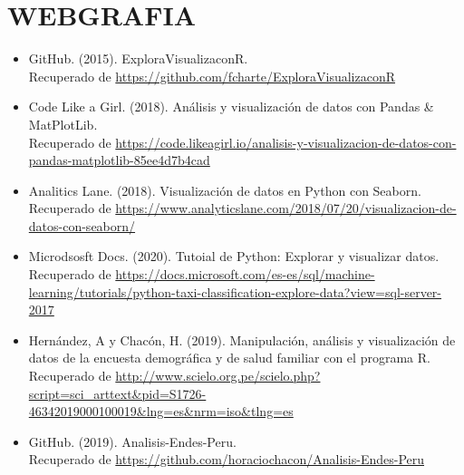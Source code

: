 \documentclass[12pt,letterpaper]{article}
\begin{document}
    \newpage
    \section{WEBGRAFIA}
    \begin{itemize}
        \item GitHub. (2015). ExploraVisualizaconR.\\
        Recuperado de \textcolor{azul}{\url{https://github.com/fcharte/ExploraVisualizaconR}}
        \item Code Like a Girl. (2018). Análisis y visualización de datos con Pandas \& MatPlotLib.\\
        Recuperado de \textcolor{azul}{\url{https://code.likeagirl.io/analisis-y-visualizacion-de-datos-con-pandas-matplotlib-85ee4d7b4cad}}
        \item Analitics Lane. (2018). Visualización de datos en Python con Seaborn.\\
        Recuperado de \textcolor{azul}{\url{https://www.analyticslane.com/2018/07/20/visualizacion-de-datos-con-seaborn/}}
        \item Microdsosft Docs. (2020). Tutoial de Python: Explorar y visualizar datos.\\
        Recuperado de \textcolor{azul}{\url{https://docs.microsoft.com/es-es/sql/machine-learning/tutorials/python-taxi-classification-explore-data?view=sql-server-2017}}
        \item Hernández, A y Chacón, H. (2019). Manipulación, análisis y visualización de datos de la encuesta demográfica y de salud familiar con el programa R.\\
        Recuperado de \textcolor{azul}{\url{http://www.scielo.org.pe/scielo.php?script=sci_arttext&pid=S1726-46342019000100019&lng=es&nrm=iso&tlng=es}}
        \item GitHub. (2019). Analisis-Endes-Peru.\\
        Recuperado de \textcolor{azul}{\url{https://github.com/horaciochacon/Analisis-Endes-Peru}}
    \end{itemize}
\end{document}
